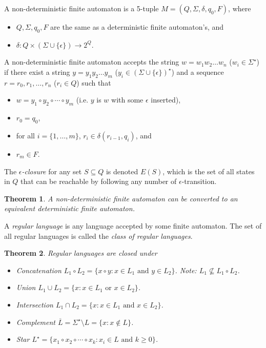 \documentclass[letterpaper,landscape,11pt]{article}
\newtheorem{theorem}{Theorem}
\begin{document}
A non-deterministic finite automaton is a 5-tuple $M = (Q, \Sigma, \delta, q_0, F)$, where
\begin{itemize}
	\item $Q, \Sigma, q_0, F$ are the same as a deterministic finite automaton's, and
	\item $\delta : Q \times (\Sigma \cup \{\epsilon\}) \rightarrow 2^Q$.
\end{itemize}

A non-deterministic finite automaton accepts the string $w = w_1w_2 \dots w_n$ ($w_i \in \Sigma^\star$) if there exist a string $y = y_1y_2 \dots y_m$ ($y_i \in (\Sigma \cup \{\epsilon\})^\star$) and a sequence $r = r_0, r_1, \dots, r_n$ ($r_i \in Q$) such that
\begin{itemize}
	\item $w = y_1 \circ y_2 \circ \cdots \circ y_m$ (i.e. $y$ is $w$ with some $\epsilon$ inserted),
	\item $r_0 = q_0$,
	\item for all $i = \{1, \dots, m\}$, $r_i \in \delta(r_{i-1}, q_i)$, and
	\item $r_m \in F$.
\end{itemize}

The \emph{$\epsilon$-closure} for any set $S \subseteq Q$ is denoted $E(S)$, which is the set of all states in $Q$ that can be reachable by following any number of $\epsilon$-transition.

\begin{theorem}
	A non-deterministic finite automaton can be converted to an equivalent deterministic finite automaton.
\end{theorem}

A \emph{regular language} is any language accepted by some finite automaton. The set of all regular languages is called the \emph{class of regular languages}.

\begin{theorem}
	Regular languages are closed under
	\begin{itemize}
		\item Concatenation $L_1 \circ L_2 = \{x \circ y : x \in L_1 \text{ and } y \in L_2\}$. Note: $L_1 \not\subseteq L_1 \circ L_2$.
		\item Union $L_1 \cup L_2 = \{x : x \in L_1 \text{ or } x \in L_2\}$.
		\item Intersection $L_1 \cap L_2 = \{x : x \in L_1 \text{ and } x \in L_2\}$.
		\item Complement $\overline{L} = \Sigma^\star \setminus L = \{x : x \notin L\}$.
		\item Star $L^\star = \{x_1 \circ x_2 \circ \cdots \circ x_k : x_i \in L \text{ and } k \geq 0\}$.
	\end{itemize}
\end{theorem}
\end{document}
